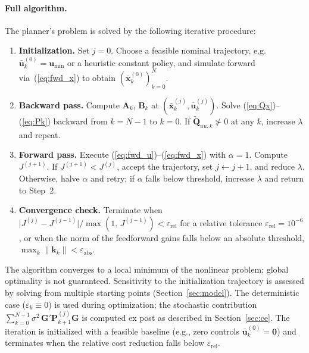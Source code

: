 \paragraph{Full algorithm.}
The planner's problem is solved by the following iterative procedure:

\begin{enumerate}
    \item \textbf{Initialization.} Set $j = 0$. Choose a feasible nominal trajectory,
        e.g.\ $\bar{\bm{u}}_k^{(0)} = \bm{u}_{\min}$ or a heuristic constant policy,
        and simulate forward via~(\ref{eq:fwd_x}) to obtain
        $(\bar{\bm{x}}_k^{(0)})_{k=0}^{N}$.

    \item \textbf{Backward pass.} Compute $\bm{A}_k$, $\bm{B}_k$ at
        $(\bar{\bm{x}}_k^{(j)}, \bar{\bm{u}}_k^{(j)})$. Solve
        (\ref{eq:Qx})--(\ref{eq:Pk}) backward from $k = N-1$ to $k = 0$.
        If $\tilde{\bm{Q}}_{uu,k} \not\succ 0$ at any $k$, increase $\lambda$ and
        repeat.

    \item \textbf{Forward pass.} Execute (\ref{eq:fwd_u})--(\ref{eq:fwd_x}) with
        $\alpha = 1$. Compute $J^{(j+1)}$. If $J^{(j+1)} < J^{(j)}$, accept the
        trajectory, set $j \leftarrow j+1$, and reduce $\lambda$. Otherwise, halve
        $\alpha$ and retry; if $\alpha$ falls below threshold, increase $\lambda$ and
        return to Step~2.

    \item \textbf{Convergence check.} Terminate when
        $\bigl|J^{(j)} - J^{(j-1)}\bigr| / \max\!\left(1,\, J^{(j-1)}\right)
        < \varepsilon_{\text{rel}}$ for a relative tolerance $\varepsilon_{\text{rel}}
        = 10^{-6}$, or when the norm of the feedforward gains falls below an absolute
        threshold, $\max_k \|\bm{k}_k\| < \varepsilon_{\text{abs}}$.
\end{enumerate}
%
The algorithm converges to a local minimum of the nonlinear problem; global
optimality is not guaranteed. Sensitivity to the initialization trajectory is
assessed by solving from multiple starting points (Section~\ref{sec:model}). The
deterministic case ($\varepsilon_k \equiv 0$) is used during optimization; the
stochastic contribution $\sum_{k=0}^{N-1}\sigma^2\,\bm{G}'\bm{P}_{k+1}^{(j)}\bm{G}$
is computed ex post as described in Section~\ref{sec:ce}.
%
The iteration is initialized with a feasible baseline (e.g., zero controls
$\bar{\bm{u}}_k^{(0)} = \bm{0}$) and terminates when the relative cost reduction
falls below $\varepsilon_{\text{rel}}$.
